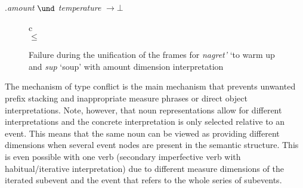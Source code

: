\ex.\label{const:temp:amount}\textit{amount} $\und$ \textit{temperature} $\rightarrow \bot$

\begin{figure}
\begin{tabular}{c}
\\
 $\leq$ 
\end{tabular}
\caption{Failure during the unification of the frames for \textit{nagret'} `to warm up and  \textit{sup} `soup' with amount dimension interpretation \label{frame:nagret:soup:amount}}
\end{figure}

The mechanism of type conflict is the main mechanism that prevents unwanted prefix stacking and inappropriate measure phrases or direct object interpretations. Note, however, that noun representations allow for different interpretations and the concrete interpretation is only selected relative to an event. This means that the same noun can be viewed as providing different dimensions when several event nodes are present in the semantic structure. This is even possible with one verb (secondary imperfective verb with habitual/iterative interpretation) due to different measure dimensions of the iterated subevent and the event that refers to the whole series of subevents.

